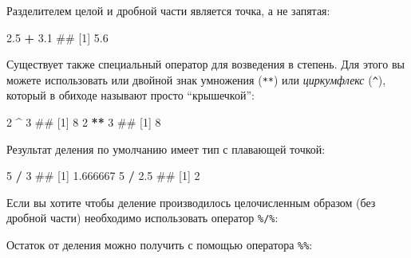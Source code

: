 \documentclass[]{book}
\newenvironment{Shaded}{\begin{snugshade}}{\end{snugshade}}
\newcommand{\DecValTok}[1]{\textcolor[rgb]{0.00,0.00,0.81}{#1}}
\newcommand{\FloatTok}[1]{\textcolor[rgb]{0.00,0.00,0.81}{#1}}
\newcommand{\StringTok}[1]{\textcolor[rgb]{0.31,0.60,0.02}{#1}}
\newcommand{\OperatorTok}[1]{\textcolor[rgb]{0.81,0.36,0.00}{\textbf{#1}}}
\newcommand{\NormalTok}[1]{#1}
\begin{document}
Разделителем целой и дробной части является точка, а не запятая:

\begin{Shaded}
\begin{Highlighting}[]
\FloatTok{2.5} \OperatorTok{+}\StringTok{ }\FloatTok{3.1}
\NormalTok{## [1] 5.6}
\end{Highlighting}
\end{Shaded}

Существует также специальный оператор для возведения в степень. Для
этого вы можете использовать или двойной знак умножения (\texttt{**})
или \emph{циркумфлекс} (\texttt{\^{}}), который в обиходе называют
просто ``крышечкой'':

\begin{Shaded}
\begin{Highlighting}[]
\DecValTok{2} \OperatorTok{^}\StringTok{ }\DecValTok{3}
\NormalTok{## [1] 8}
\DecValTok{2} \OperatorTok{**}\StringTok{ }\DecValTok{3}
\NormalTok{## [1] 8}
\end{Highlighting}
\end{Shaded}

Результат деления по умолчанию имеет тип с плавающей точкой:

\begin{Shaded}
\begin{Highlighting}[]
\DecValTok{5} \OperatorTok{/}\StringTok{ }\DecValTok{3}
\NormalTok{## [1] 1.666667}
\DecValTok{5} \OperatorTok{/}\StringTok{ }\FloatTok{2.5}
\NormalTok{## [1] 2}
\end{Highlighting}
\end{Shaded}

Если вы хотите чтобы деление производилось целочисленным образом (без
дробной части) необходимо использовать оператор \texttt{\%/\%}:

\begin{Shaded}
\end{Shaded}

Остаток от деления можно получить с помощью оператора \texttt{\%\%}:

\begin{Shaded}
\end{Shaded}
\end{document}
